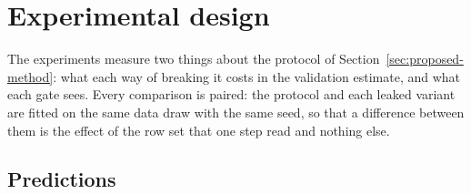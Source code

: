 \section{Experimental design}
\label{sec:experimental-design}

The experiments measure two things about the protocol of Section~\ref{sec:proposed-method}: what each way of breaking it costs in the validation estimate, and what each gate sees. Every comparison is paired: the protocol and each leaked variant are fitted on the same data draw with the same seed, so that a difference between them is the effect of the row set that one step read and nothing else.

\subsection{Predictions}

